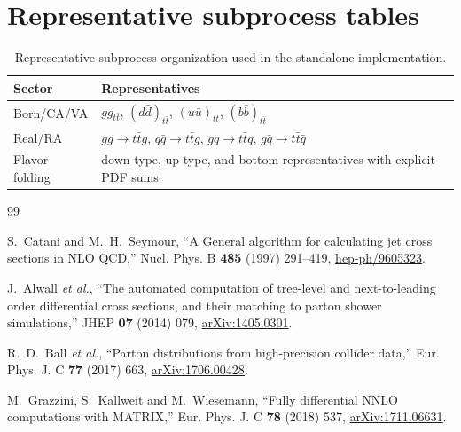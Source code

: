\documentclass[11pt]{article}
\begin{document}
\section{Representative subprocess tables}

\begin{table}[H]
\centering
\caption{Representative subprocess organization used in the standalone implementation.}
\begin{tabular}{ll}
\toprule
Sector & Representatives \\
\midrule
Born/CA/VA & $gg_{t\bar t}$, $(d\bar d)_{t\bar t}$, $(u\bar u)_{t\bar t}$, $(b\bar b)_{t\bar t}$ \\
Real/RA & $gg\to t\bar t g$, $q\bar q\to t\bar t g$, $gq\to t\bar t q$, $g\bar q\to t\bar t\bar q$ \\
Flavor folding & down-type, up-type, and bottom representatives with explicit PDF sums \\
\bottomrule
\end{tabular}
\end{table}

\begin{thebibliography}{99}

S.~Catani and M.~H.~Seymour,
``A General algorithm for calculating jet cross sections in NLO QCD,''
Nucl. Phys. B \textbf{485} (1997) 291--419,
\href{https://arxiv.org/abs/hep-ph/9605323}{hep-ph/9605323}.

J.~Alwall \textit{et al.},
``The automated computation of tree-level and next-to-leading order differential cross sections, and their matching to parton shower simulations,''
JHEP \textbf{07} (2014) 079,
\href{https://arxiv.org/abs/1405.0301}{arXiv:1405.0301}.

R.~D.~Ball \textit{et al.},
``Parton distributions from high-precision collider data,''
Eur. Phys. J. C \textbf{77} (2017) 663,
\href{https://arxiv.org/abs/1706.00428}{arXiv:1706.00428}.

M.~Grazzini, S.~Kallweit and M.~Wiesemann,
``Fully differential NNLO computations with MATRIX,''
Eur. Phys. J. C \textbf{78} (2018) 537,
\href{https://arxiv.org/abs/1711.06631}{arXiv:1711.06631}.

\end{thebibliography}
\end{document}
